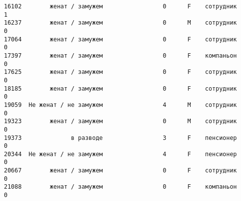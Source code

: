 \documentclass[11pt]{article}
\begin{document}
\begin{Verbatim}[commandchars=\\\{\}]
16102        женат / замужем                 0      F    сотрудник     1
16237        женат / замужем                 0      M    сотрудник     0
17064        женат / замужем                 0      F    сотрудник     0
17397        женат / замужем                 0      F    компаньон     0
17625        женат / замужем                 0      F    сотрудник     0
18185        женат / замужем                 0      F    сотрудник     0
19059  Не женат / не замужем                 4      M    сотрудник     0
19323        женат / замужем                 0      M    сотрудник     0
19373              в разводе                 3      F    пенсионер     0
20344  Не женат / не замужем                 4      F    пенсионер     0
20667        женат / замужем                 0      F    сотрудник     0
21088        женат / замужем                 0      F    компаньон     0


\end{Verbatim}
\end{document}
